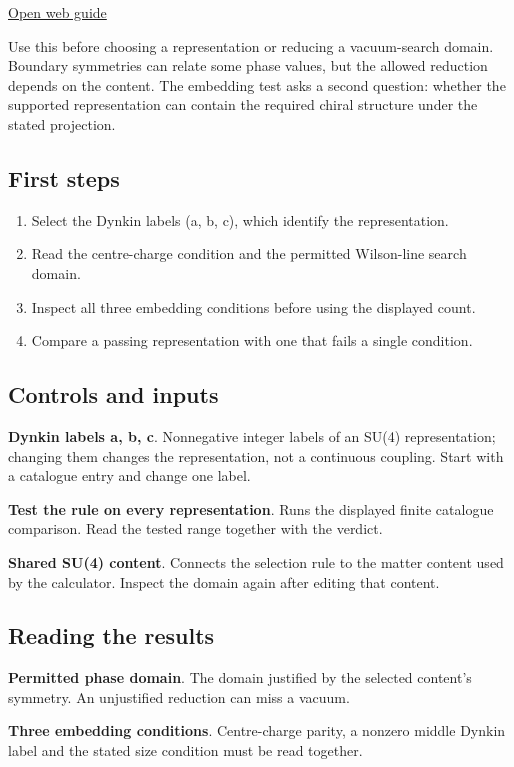 \documentclass[11pt,a4paper]{article}
\begin{document}
\href{https://karlesmarin.github.io/ghu-explorer/guide/selection/index.html}{Open web guide}

Use this before choosing a representation or reducing a vacuum-search domain. Boundary symmetries can relate some phase values, but the allowed reduction depends on the content. The embedding test asks a second question: whether the supported representation can contain the required chiral structure under the stated projection.
\subsection*{First steps}
\begin{enumerate}
\item Select the Dynkin labels (a, b, c), which identify the representation.
\item Read the centre-charge condition and the permitted Wilson-line search domain.
\item Inspect all three embedding conditions before using the displayed count.
\item Compare a passing representation with one that fails a single condition.
\end{enumerate}
\subsection*{Controls and inputs}
\textbf{Dynkin labels a, b, c}. Nonnegative integer labels of an SU(4) representation; changing them changes the representation, not a continuous coupling. Start with a catalogue entry and change one label.

\textbf{Test the rule on every representation}. Runs the displayed finite catalogue comparison. Read the tested range together with the verdict.

\textbf{Shared SU(4) content}. Connects the selection rule to the matter content used by the calculator. Inspect the domain again after editing that content.

\subsection*{Reading the results}
\textbf{Permitted phase domain}. The domain justified by the selected content's symmetry. An unjustified reduction can miss a vacuum.

\textbf{Three embedding conditions}. Centre-charge parity, a nonzero middle Dynkin label and the stated size condition must be read together.
\end{document}
